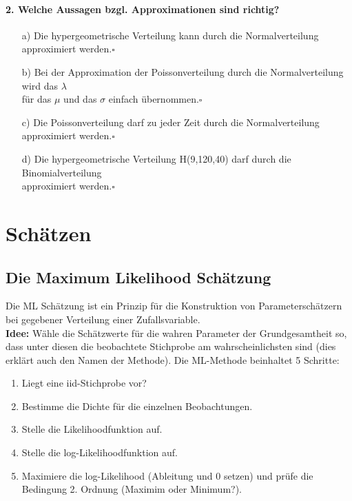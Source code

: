 \documentclass[a4paper]{article}
\begin{document}
\paragraph{2. Welche Aussagen bzgl. Approximationen sind richtig?}
\begin{itemize}
    \item[a)]Die hypergeometrische Verteilung kann durch die Normalverteilung approximiert werden.\hfill $\square$
    \item[b)]Bei der Approximation der Poissonverteilung durch die Normalverteilung wird das $\lambda$\\ für das $\mu$ und das $\sigma$ einfach übernommen.\hfill $\square$
    \item[c)]Die Poissonverteilung darf zu jeder Zeit durch die Normalverteilung approximiert werden.\hfill $\square$
    \item[d)] Die hypergeometrische Verteilung H(9,120,40) darf durch die Binomialverteilung \\approximiert werden.\hfill $\square$
\end{itemize}


\clearpage


\section{Schätzen}\label{chap:schaetzen}

\subsection{Die Maximum Likelihood Schätzung}\label{sec:ML}

Die ML Schätzung ist ein Prinzip für die Konstruktion von Parameterschätzern bei gegebener Verteilung einer Zufallsvariable.\\

\noindent \textbf{Idee:} Wähle die Schätzwerte für die wahren Parameter der Grundgesamtheit so, dass unter diesen die beobachtete Stichprobe am wahrscheinlichsten sind (dies erklärt auch den Namen der Methode). Die ML-Methode beinhaltet 5 Schritte:

\begin{enumerate}
    \item Liegt eine iid-Stichprobe vor?
    \item Bestimme die Dichte für die einzelnen Beobachtungen.
    \item Stelle die Likelihoodfunktion auf.
    \item Stelle die log-Likelihoodfunktion auf.
    \item Maximiere die log-Likelihood (Ableitung und 0 setzen) und prüfe die Bedingung 2. Ordnung (Maximim oder Minimum?).
\end{enumerate}
\end{document}
